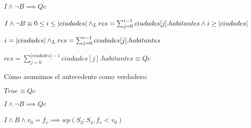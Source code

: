 \documentclass[10pt,a4paper]{article}
\begin{document}
\paragraph{$I \wedge \neg B \implies Qc$}
$I \wedge \neg B \equiv 0 \leq i \leq |ciudades| \land _L res = \sum_{j=0}^{i-1} ciudades[j].habitantes \wedge i \geq |ciudades| $ \equiv \par

\begin{center}
  $i = |ciudades| \land _L res = \sum_{j=0}^{i-1} ciudades[j].habitantes$ \implies \par
\vspace{5px}  
$res = \sum_{j=0}^{|ciudades|-1} ciudades[j].habitantes \equiv Qc$  \par
\vspace{5px}
\end{center}
\par Cómo asumimos el antecedente como verdadero:
\vspace{5px}
\begin{center}
$True \equiv Qc $\par
\vspace{5px}
$I \wedge \neg B \implies Qc$
\end{center}

\paragraph{$I \wedge  B \wedge v_{0}=f_{v} \implies wp(S_{3};S_{4}, f_{v} < v_{0})$}
\end{document}
